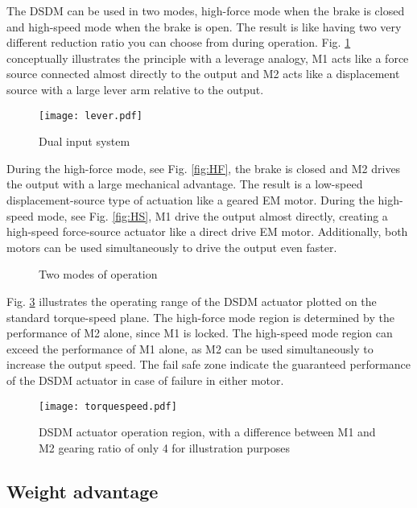 The DSDM can be used in two modes, high-force mode when the brake is closed and high-speed mode when the brake is open. The result is like having two very different reduction ratio you can choose from during operation. Fig. \ref{fig:lever} conceptually illustrates the principle with a leverage analogy, M1 acts like a force source connected almost directly to the output and M2 acts like a displacement source with a large lever arm relative to the output. 
%
\begin{figure}[H]
	\centering
		\texttt{[image: lever.pdf]}
	\caption{Dual input system}
	\label{fig:lever}
\end{figure}
%
During the high-force mode, see Fig. \ref{fig:HF}, the brake is closed and M2 drives the output with a large mechanical advantage. The result is a low-speed displacement-source type of actuation like a geared EM motor. During the high-speed mode, see Fig. \ref{fig:HS}, M1 drive the output almost directly, creating a high-speed force-source actuator like a direct drive EM motor. Additionally, both motors can be used simultaneously to drive the output even faster.
%
\begin{figure}[H]
        \centering
        \caption{Two modes of operation}\label{fig:opmode}
\end{figure}

Fig. \ref{fig:torquespeed} illustrates the operating range of the DSDM actuator plotted on the standard torque-speed plane. The high-force mode region is determined by the performance of M2 alone, since M1 is locked. The high-speed mode region can exceed the performance of M1 alone, as M2 can be used simultaneously to increase the output speed. The fail safe zone indicate the guaranteed performance of the DSDM actuator in case of failure in either motor. 

\begin{figure}[H]
	\centering
		\texttt{[image: torquespeed.pdf]}
	\caption{DSDM actuator operation region, with a difference between M1 and M2 gearing ratio of only 4 for illustration purposes }
	\label{fig:torquespeed}
\end{figure}

\subsection{Weight advantage}
\label{sec:WeightAdvantage}


